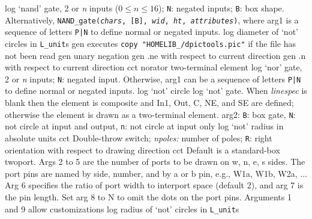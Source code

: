   {log}%
  {`nand' gate, 2 or {\sl n\/} inputs ($0 \leq n \leq 16$);
   {\tt N}: negated inputs; {\tt B}: box shape.
   Alternatively, {\tt NAND\_gate({\sl chars}, [B], {\sl wid},
    {\sl ht}, {\sl attributes})}, where
   arg1 is a sequence of letters {\tt P|N} to define
   normal or negated inputs.
    }%
%
  {log}%
  {diameter of `not' circles in {\tt L\_unit}s}%
%
  {gen}%
  {executes {\tt copy "HOMELIB\_/dpictools.pic"} if the file has
  not been read}%
%
  {gen}%
  {unary negation}%
%
  {gen}%
  {.ne with respect to current direction}%
%
  {gen}%
  {.n with respect to current direction}%
%
  {cct}%
  { norator two-terminal element }%
%
  {log}%
  {`nor' gate, 2 or {\sl n\/} inputs; {\tt N}: negated input.
   Otherwise, arg1 can be a sequence of letters {\tt P|N} to define
   normal or negated inputs.
    }%
%
  {log}%
  {`not' circle}%
%
  {log}%
  {`not' gate.
   When {\sl linespec} is blank then the element is composite and In1,
   Out, C, NE, and SE are defined; otherwise the element is drawn as a
   two-terminal element. arg2: {\tt B}: box gate, {\tt N}: not circle at
   input and output, {\tt n}: not circle at input only
    }%
%
  {log}%
  {`not' radius in absolute units}%
%
  {cct}%
  {Double-throw switch; {\sl npoles:} number of poles;
   {\tt R}: right orientation with respect to drawing direction
   }%
%
  {cct}%
  { Default is a standard-box twoport.  Args 2 to 5 are
    the number of ports to be drawn on w, n, e, s sides.  The port pins
    are named by side, number, and by a or b pin, e.g., W1a, W1b, W2a,
    $\ldots$ Arg 6 specifies the ratio of port width to interport space
    (default 2), and arg 7 is the pin length.  Set arg 8 to N to omit
    the dots on the port pins. Arguments 1 and 9 allow customizations
   }%
%
  {log}%
  {radius of `not' circles in {\tt L\_unit}s}%
%
